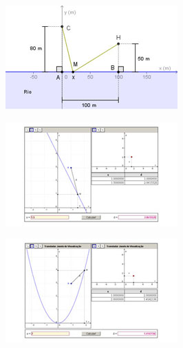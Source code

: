\begin{figure}
    \begin{subfigure}{0.3\textwidth}
    \centering
    \includegraphics[width=.9\textwidth]{icones-modulos/pot-m-pch.jpg}
    \end{subfigure}
    \hfill
    \begin{subfigure}{0.3\textwidth}
    \centering
    \includegraphics[width=.9\textwidth]{icones-modulos/pot-m-pre.jpg}
    \label{fig:pre-ic}
    \end{subfigure}
    \hfill
    \begin{subfigure}{0.3\textwidth}
    \centering
    \includegraphics[width=.9\textwidth]{icones-modulos/pot-m-ppa.jpg}
    \label{fig:ppa-ic}
    \end{subfigure}
    

\end{figure}
